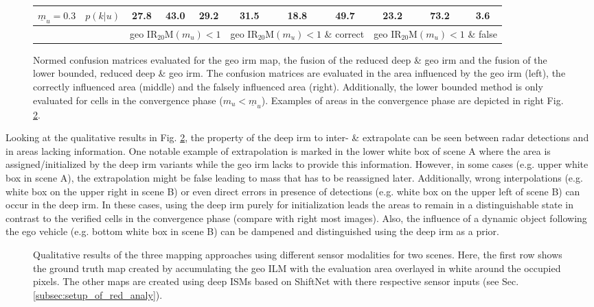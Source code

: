 \begin{figure}[H]
\begin{center}
{\begin{tabular}{c|c|ccc|ccc|ccc}
	\scriptsize{$\underline{m}_u = 0.3$}&$p(k|u)$ & 27.8 & 43.0 & 29.2& 31.5 & 18.8 & 49.7& 23.2 & 73.2 & 3.6 \\
\hline
	& & \multicolumn{3}{c|}{\scriptsize{geo IR$_{20}$M$(m_u) < 1$}} & \multicolumn{3}{c|}{\scriptsize{geo IR$_{20}$M$(m_u) < 1$ \& correct}} & \multicolumn{3}{c}{\scriptsize{geo IR$_{20}$M$(m_u) < 1$ \& false}} 
\end{tabular}}
\caption{\label{fig:quant_analysis_of_prior}Normed confusion matrices evaluated for the geo \gls{irm} map, the fusion of the reduced deep \& geo \gls{irm} and the fusion of the lower bounded, reduced deep \& geo \gls{irm}. The confusion matrices are evaluated in the area influenced by the geo \gls{irm} (left), the correctly influenced area (middle) and the falsely influenced area (right). Additionally, the lower bounded method is only evaluated for cells in the convergence phase ($m_u < \underline{m}_u$). Examples of areas in the convergence phase are depicted in right Fig. \ref{fig:qual_analysis_of_prior}.}
\end{center}
\end{figure}
%
Looking at the qualitative results in Fig. \ref{fig:qual_analysis_of_prior}, the property of the deep \gls{irm} to inter- \& extrapolate can be seen between radar detections and in areas lacking information. One notable example of extrapolation is marked in the lower white box of scene A where the area is assigned/initialized by the deep \gls{irm} variants while the geo \gls{irm} lacks to provide this information. However, in some cases (e.g. upper white box in scene A), the extrapolation might be false leading to mass that has to be reassigned later. Additionally, wrong interpolations (e.g. white box on the upper right in scene B) or even direct errors in presence of detections (e.g. white box on the upper left of scene B) can occur in the deep \gls{irm}. In these cases, using the deep \gls{irm} purely for initialization leads the areas to remain in a distinguishable state in contrast to the verified cells in the convergence phase (compare with right most images). Also, the influence of a dynamic object following the ego vehicle (e.g. bottom white box in scene B) can be dampened and distinguished using the deep \gls{irm} as a prior.
%
\begin{figure}[H]
	\begin{center}
		\caption{\label{fig:qual_analysis_of_prior}Qualitative results of the three mapping approaches using different sensor modalities for two scenes. Here, the first row shows the ground truth map created by accumulating the geo ILM with the evaluation area overlayed in white around the occupied pixels. The other maps are created using deep ISMs based on ShiftNet with there respective sensor inputs (see Sec. \ref{subsec:setup_of_red_analy}).}
	\end{center}
\end{figure}
%
